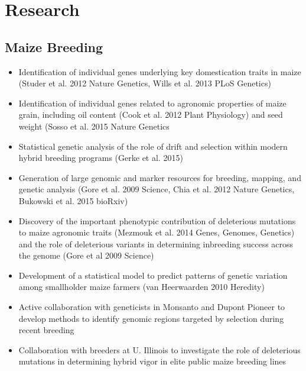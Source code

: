 \documentclass[]{article}
\begin{document}
\section*{Research}

\subsection*{Maize Breeding}
\begin{itemize}
\item Identification of individual genes underlying key domestication traits in maize (Studer et al. 2012 Nature Genetics, Wills et al. 2013 PLoS Genetics)
\item Identification of individual genes related to agronomic properties of maize grain, including oil content (Cook et al. 2012 Plant Physiology) and seed weight (Sosso et al. 2015 Nature Genetics
\item Statistical genetic analysis of the role of drift and selection within modern hybrid breeding programs (Gerke et al. 2015)
\item Generation of large genomic and marker resources for breeding, mapping, and genetic analysis (Gore et al. 2009 Science, Chia et al. 2012 Nature Genetics, Bukowski et al. 2015 bioRxiv)
\item Discovery of the important phenotypic contribution of deleterious mutations to maize agronomic traits (Mezmouk et al. 2014 Genes, Genomes, Genetics) and the role of deleterious variants in determining inbreeding success across the genome (Gore et al 2009 Science)
\item Development of a statistical model to predict patterns of genetic variation among smallholder maize farmers (van Heerwaarden 2010 Heredity)
\item Active collaboration with geneticists in Monsanto and Dupont Pioneer to develop methods to identify genomic regions targeted by selection during recent breeding
\item Collaboration with breeders at U. Illinois to investigate the role of deleterious mutations in determining hybrid vigor in elite public maize breeding lines
\end{itemize}
\end{document}
